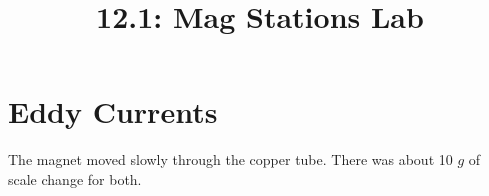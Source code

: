 \documentclass{article}
\title{12.1: Mag Stations Lab}
\begin{document}
\section*{Eddy Currents}
The magnet moved slowly through the copper tube.
There was about 10 $g$ of scale change for both.
\end{document}
